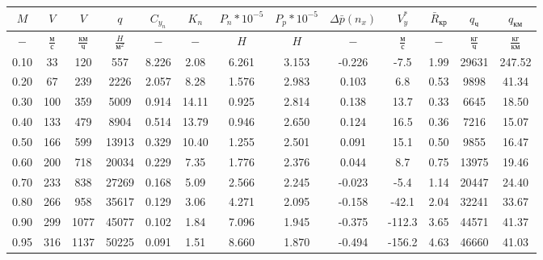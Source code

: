 \begin{tabular}{|c|c|c|c|c|c|c|c|c|c|c|c|c|}
\hline
$M$ & $V$ & $V$ & $q$ & $C_{y_n}$ & $K_n$ & $P_n*10^{-5}$ & $P_p*10^{-5}$ & $\Delta \bar{p}(n_x)$ & $V_y^*$ & $\bar{R}_{кр}$ & $q_{ч}$ & $q_{км}$ \\ 
\hline
$-$ & $\frac{м}{с}$ & $\frac{км}{ч}$ & $\frac{H}{м^2}$ & $-$ & $-$ & $H$ & $H$ & $-$ & $\frac{м}{с}$ & $-$ & $\frac{кг}{ч}$ & $\frac{кг}{км}$ \\ 
\hline
0.10 & 33 & 120 & 557 & 8.226 & 2.08 & 6.261 & 3.153 & -0.226 & -7.5 & 1.99 & 29631 & 247.52 \\ 
\hline
0.20 & 67 & 239 & 2226 & 2.057 & 8.28 & 1.576 & 2.983 & 0.103 & 6.8 & 0.53 & 9898 & 41.34 \\ 
\hline
0.30 & 100 & 359 & 5009 & 0.914 & 14.11 & 0.925 & 2.814 & 0.138 & 13.7 & 0.33 & 6645 & 18.50 \\ 
\hline
0.40 & 133 & 479 & 8904 & 0.514 & 13.79 & 0.946 & 2.650 & 0.124 & 16.5 & 0.36 & 7216 & 15.07 \\ 
\hline
0.50 & 166 & 599 & 13913 & 0.329 & 10.40 & 1.255 & 2.501 & 0.091 & 15.1 & 0.50 & 9855 & 16.47 \\ 
\hline
0.60 & 200 & 718 & 20034 & 0.229 & 7.35 & 1.776 & 2.376 & 0.044 & 8.7 & 0.75 & 13975 & 19.46 \\ 
\hline
0.70 & 233 & 838 & 27269 & 0.168 & 5.09 & 2.566 & 2.245 & -0.023 & -5.4 & 1.14 & 20447 & 24.40 \\ 
\hline
0.80 & 266 & 958 & 35617 & 0.129 & 3.06 & 4.271 & 2.095 & -0.158 & -42.1 & 2.04 & 32241 & 33.67 \\ 
\hline
0.90 & 299 & 1077 & 45077 & 0.102 & 1.84 & 7.096 & 1.945 & -0.375 & -112.3 & 3.65 & 44571 & 41.37 \\ 
\hline
0.95 & 316 & 1137 & 50225 & 0.091 & 1.51 & 8.660 & 1.870 & -0.494 & -156.2 & 4.63 & 46660 & 41.03 \\ 
\hline
\end{tabular}